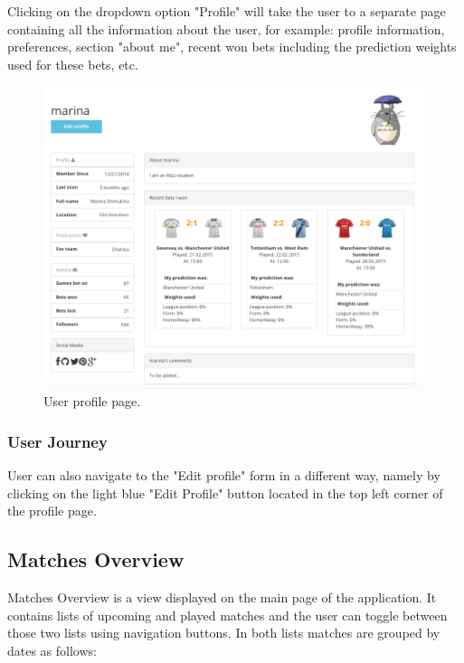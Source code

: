Clicking on the dropdown option "Profile" will take the user to a separate page containing all the information about the user, for example: profile information, preferences, section "about me", recent won bets including the prediction weights used for these bets, etc. 

\begin{figure}[H]
	\begin{center}
		\includegraphics[width=.90\textwidth]{impl/images/profile}
		\caption{User profile page.} 
		\label{fig:profile}
	\end{center}
\end{figure}

\subsubsection*{User Journey}
\label{subsec:authandprofileuserjourney}
User can also navigate to the "Edit profile" form in a different way, namely by clicking on the light blue "Edit Profile" button located in the top left corner of the profile page. 

\subsection{Matches Overview}
Matches Overview is a view displayed on the main page of the application. It contains lists of upcoming and played matches and the user can toggle between those two lists using navigation buttons. In both lists matches are grouped by dates as follows:

